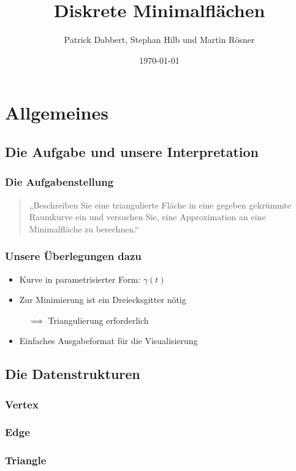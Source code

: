 \documentclass{beamer}
\title{Diskrete Minimalflächen}
\author{Patrick Dabbert, Stephan Hilb und Martin Rösner}
\date{\today}
\begin{document}
\begin{frame}
	\titlepage
\end{frame}


\section{Allgemeines}

\subsection{Die Aufgabe und unsere Interpretation}

\begin{frame}
	\frametitle{Die Aufgabenstellung}
	\begin{quote}
		„Beschreiben Sie eine triangulierte Fläche in eine gegeben gekrümmte Raumkurve ein und versuchen Sie, eine Approximation an eine Minimalfläche zu berechnen.“
	\end{quote}
\end{frame}

\begin{frame}
	\frametitle{Unsere Überlegungen dazu}
	\begin{itemize}
		\item
			Kurve in parametrisierter Form: $\gamma(t)$
		\item
			Zur Minimierung ist ein Dreiecksgitter nötig
			
			$\quad \implies$ Triangulierung erforderlich
		\item
			Einfaches Ausgabeformat für die Visualisierung
	\end{itemize}
\end{frame}

\subsection{Die Datenstrukturen}

\begin{frame}
	\frametitle{Vertex}
	
\end{frame}

\begin{frame}
	\frametitle{Edge}
	
\end{frame}

\begin{frame}
	\frametitle{Triangle}
	
\end{frame}
\end{document}
